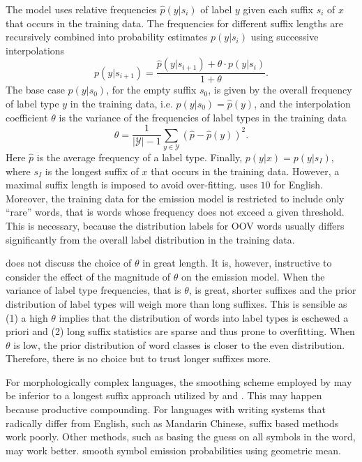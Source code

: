 The model uses relative frequencies $\hat{p}(y|s_i)$ of label $y$ given
each suffix $s_i$ of $x$ that occurs in the training data. The
frequencies for different suffix lengths are recursively combined into
probability estimates $p(y|s_i)$ using successive interpolations
$$p(y|s_{i+1}) = \frac{\hat{p}(y|s_{i+1}) + \theta \cdot p(y|s_{i})}{1 + \theta}.$$
The base case $p(y|s_0)$, for the empty suffix $s_0$, is given by the
overall frequency of label type $y$ in the training data,
i.e. $p(y|s_0) = \hat{p}(y)$, and the interpolation coefficient
$\theta$ is the variance of the frequencies of label types in the
training data
$$\theta = \frac{1}{|\mathcal{Y}| - 1} \sum_{y\in \mathcal{Y}} (\hat{p} - \hat{p}(y))^2.$$
Here $\hat{p}$ is the average frequency of a label type. Finally,
$p(y|x) = p(y|s_I)$, where $s_I$ is the longest suffix of $x$ that
occurs in the training data. However, a maximal suffix length is
imposed to avoid over-fitting. \cite{Brants2000} uses $10$ for
English. Moreover, the training data for the emission model is
restricted to include only ``rare'' words, that is words whose
frequency does not exceed a given threshold. This is necessary,
because the distribution labels for OOV words usually differs
significantly from the overall label distribution in the training
data.

\cite{Brants2000} does not discuss the choice of $\theta$ in great
length. It is, however, instructive to consider the effect of the
magnitude of $\theta$ on the emission model.  When the variance of
label type frequencies, that is $\theta$, is great, shorter suffixes
and the prior distribution of label types will weigh more than long
suffixes. This is sensible as (1) a high $\theta$ implies that the
distribution of words into label types is eschewed a priori and (2)
long suffix statistics are sparse and thus prone to overfitting. When
$\theta$ is low, the prior distribution of word classes is closer to
the even distribution. Therefore, there is no choice but to trust
longer suffixes more.

For morphologically complex languages, the smoothing scheme employed
by \cite{Brants2000} may be inferior to a longest suffix approach
utilized by \cite{Silfverberg2011} and \cite{Linden2009}. This may
happen because productive compounding. For languages with writing
systems that radically differ from English, such as Mandarin Chinese,
suffix based methods work poorly. Other methods, such as basing the
guess on all symbols in the word, may work better. \cite{Huang2007}
smooth symbol emission probabilities using geometric mean.
 
